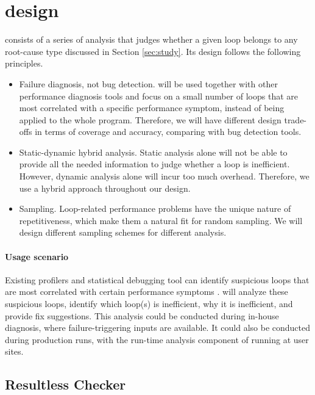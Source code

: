 \section{\Tool design}
\label{sec:design}
\Tool consists of a series of analysis that
judges whether a given loop belongs to any root-cause type discussed in
Section \ref{sec:study}.
Its design
follows the following principles.
\begin{itemize}
\item Failure diagnosis, not bug detection. \Tool will be  
used together with other performance diagnosis tools \cite{SongOOPSLA2014}
and focus on a small
number of loops that are most correlated with a specific performance symptom,
instead of being applied to the whole program. Therefore, we will have different
design trade-offs in terms of coverage and accuracy, comparing with 
bug detection tools.

\item Static-dynamic hybrid analysis. Static analysis alone
will not be able to provide all the needed information to judge whether
a loop is inefficient. However, 
dynamic analysis alone will incur too much overhead.
Therefore, we use a hybrid approach throughout our design.

\item Sampling. Loop-related 
performance problems have the unique nature of repetitiveness, which make 
them a natural fit for random sampling. We will design different
sampling schemes for different analysis.
\end{itemize}

\paragraph{Usage scenario}
Existing profilers and statistical debugging tool can
identify suspicious loops that are most correlated with 
certain performance 
symptoms \cite{SongOOPSLA2014}. 
\Tool will analyze
these suspicious loops, identify which loop(s) is inefficient, why it is
inefficient, and provide fix suggestions. This analysis could be
conducted during in-house diagnosis, where failure-triggering inputs
are available. It could also be conducted during production runs, with
the run-time analysis component of \Tool running 
at user sites.



\subsection{Resultless Checker}
\label{sec:workless}


